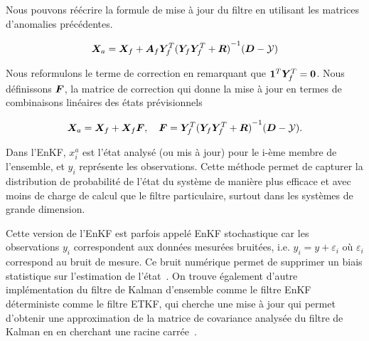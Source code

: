 Nous pouvons réécrire la formule de mise à jour du filtre en utilisant les matrices d'anomalies précédentes.

\begin{equation*}
    \bm{X}_a = \bm{X}_f + \bm A_f \bm Y_f^T {({\bm Y_f \bm Y_f^T + \bm R})}^{-1}(\bm{D} - \mathcal{Y})
\end{equation*}

Nous reformulons le terme de correction en remarquant que $ \bm{1}^T \bm Y_f^T = \bm{0}$. Nous définissons $\bm{F}$, la matrice de correction qui donne la mise à jour en termes de combinaisons linéaires des états prévisionnels

\begin{equation}
    \bm{X}_a = \bm{X}_f + \bm{X}_f \bm{F}, \quad \bm{F} = \bm Y_f^T {(\bm Y_f \bm Y_f^T + \bm R)}^{-1}(\bm{D} - \mathcal{Y}).
\end{equation}




Dans l'EnKF, $x_{i}^{a}$ est l'état analysé (ou mis à jour) pour le i-ème membre de l'ensemble, et $y_i$ représente les observations. Cette méthode permet de capturer la distribution de probabilité de l'état du système de manière plus efficace et avec moins de charge de calcul que le filtre particulaire, surtout dans les systèmes de grande dimension.

Cette version de l'EnKF est parfois appelé EnKF stochastique car les observations $y_i$ correspondent aux données mesurées bruitées, i.e. $y_i = y + \varepsilon_i$ où $\varepsilon_i$ correspond au bruit de mesure. Ce bruit numérique permet de supprimer un biais statistique sur l'estimation de l'état~\cite{van_leeuwen_consistent_2020}. On trouve également d'autre implémentation du filtre de Kalman d'ensemble comme le filtre EnKF déterministe comme le filtre ETKF, qui cherche une mise à jour qui permet d'obtenir une approximation de la matrice de covariance analysée du filtre de Kalman en en cherchant une racine carrée~\cite{bishop_adaptive_2001}.

